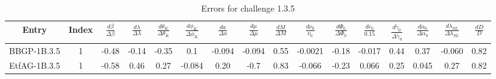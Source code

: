 \documentclass[prd,aps,amsfonts,amsmath, nofootinbib]{revtex4}
\begin{document}
\begin{table}
\caption{\label{EMRI_err} Errors for challenge 1.3.5}
\begin{ruledtabular}
\begin{tabular}{|c|c|c|c|c|c|c|c|c|c|c|c|c|c|c|c|}
Entry & Index & $\frac{d\beta}{\Delta\beta}$ & 
$\frac{d\lambda}{\Delta\lambda}$ &
 $\frac{d\theta_K}{\Delta\theta_K}$ & $\frac{d\phi_K}{\Delta\phi_K}$ 
 & $\frac{da}{\Delta a}$ & $\frac{d\mu}{\Delta\mu}$ & 
 $\frac{dM}{\Delta M}$ &  $\frac{d\nu_0}{\nu_0}$ & 
 $\frac{d\Phi_0}{\Delta\Phi_0}$ &  $\frac{de_0}{0.15}$ & 
 $\frac{d\tilde{\gamma}_0}{\Delta\tilde{\gamma}_0}$ &
 $\frac{d\alpha_0}{\Delta\alpha_0}$ & 
 $\frac{d\lambda_{SL}}{\Delta\lambda_{SL}}$ &
  $\frac{dD}{D}$ \\ 
\hline
BBGP-1B.3.5 & 1 &  -0.48   &   -0.14   &   -0.35   &   0.1   &   -0.094   &   -0.094   &   0.55   &   -0.0021   &   -0.18   &   -0.017   &   0.44   &   0.37   &   -0.060   &   0.82 \\
EtfAG-1B.3.5 & 1 &  -0.58   &   0.46   &   0.27   &   -0.084   &   0.20   &   -0.7   &   0.83   &   -0.066   &   -0.23   &   0.066   &   0.25   &   0.045   &   0.27   &   0.82 \\
\hline
\end{tabular}
\end{ruledtabular}
\end{table}
\end{document}
